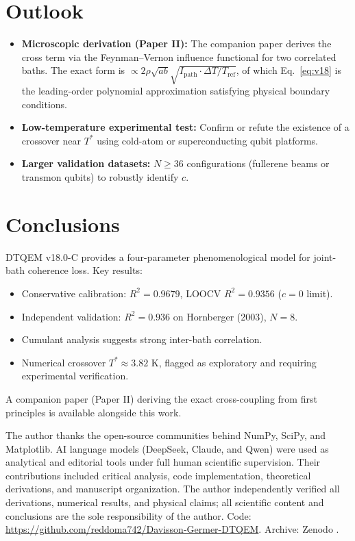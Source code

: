 \documentclass[aps,pra,reprint,amsmath,amssymb,superscriptaddress]{revtex4-2}
\begin{document}
\section{Outlook}
\begin{itemize}
    \item \textbf{Microscopic derivation (Paper II):} The companion paper derives the cross term via the Feynman--Vernon influence functional for two correlated baths. The exact form is $\propto 2\rho\sqrt{ab}\sqrt{I_{\text{path}} \cdot \Delta T/T_{\text{ref}}}$, of which Eq.~\eqref{eq:v18} is the leading-order polynomial approximation satisfying physical boundary conditions.
    \item \textbf{Low-temperature experimental test:} Confirm or refute the existence of a crossover near $T^*$ using cold-atom or superconducting qubit platforms.
    \item \textbf{Larger validation datasets:} $N \geq 36$ configurations (fullerene beams or transmon qubits) to robustly identify $c$.
\end{itemize}

\section{Conclusions}
DTQEM v18.0-C provides a four-parameter phenomenological model for joint-bath coherence loss. Key results:
\begin{itemize}
    \item Conservative calibration: $R^2 = 0.9679$, LOOCV $R^2 = 0.9356$ ($c=0$ limit).
    \item Independent validation: $R^2 = 0.936$ on Hornberger (2003), $N=8$.
    \item Cumulant analysis suggests strong inter-bath correlation.
    \item Numerical crossover $T^* \approx 3.82$ K, flagged as exploratory and requiring experimental verification.
\end{itemize}
A companion paper (Paper II) deriving the exact cross-coupling from first principles is available alongside this work.

\begin{acknowledgments}
The author thanks the open-source communities behind NumPy, SciPy, and Matplotlib. AI language models (DeepSeek, Claude, and Qwen) were used as analytical and editorial tools under full human scientific supervision. Their contributions included critical analysis, code implementation, theoretical derivations, and manuscript organization. The author independently verified all derivations, numerical results, and physical claims; all scientific content and conclusions are the sole responsibility of the author. Code: \url{https://github.com/reddoma742/Davisson-Germer-DTQEM}. Archive: Zenodo \cite{Berramdane2026}.
\end{acknowledgments}
\end{document}
